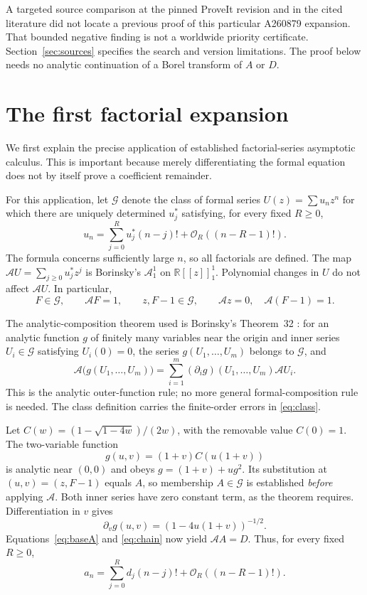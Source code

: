 \documentclass[11pt,letterpaper]{article}
\numberwithin{equation}{section}
\theoremstyle{remark}\newtheorem{remark}[theorem]{Remark}
\newcommand{\R}{\mathbb R}
\newcommand{\Ord}{\mathcal O}
\newcommand{\As}{\mathcal A}
\begin{document}
A targeted source comparison at the pinned ProveIt revision and in the cited literature did not locate a previous proof of this particular A260879 expansion. That bounded negative finding is not a worldwide priority certificate. Section~\ref{sec:sources} specifies the search and version limitations. The proof below needs no analytic continuation of a Borel transform of $A$ or $D$.

\section{The first factorial expansion}
\label{sec:factorial}
We first explain the precise application of established factorial-series asymptotic calculus. This is important because merely differentiating the formal equation does not by itself prove a coefficient remainder.

For this application, let $\mathcal G$ denote the class of formal series $U(z)=\sum u_nz^n$ for which there are uniquely determined $u_j^*$ satisfying, for every fixed $R\ge0$,
\begin{equation}\label{eq:class}
 u_n=\sum_{j=0}^{R}u_j^*(n-j)!+\Ord_R((n-R-1)!).
\end{equation}
The formula concerns sufficiently large $n$, so all factorials are defined. The map $\As U=\sum_{j\ge0}u_j^*z^j$ is Borinsky's $\As_1^1$ on $\R[[z]]_1^1$. Polynomial changes in $U$ do not affect $\As U$. In particular,
\begin{equation}\label{eq:baseA}
 F\in\mathcal G,\qquad \As F=1,\qquad
 z,F-1\in\mathcal G,\qquad \As z=0,\quad\As(F-1)=1.
\end{equation}

The analytic-composition theorem used is Borinsky's Theorem~32 \cite{borinsky}: for an analytic function $g$ of finitely many variables near the origin and inner series $U_i\in\mathcal G$ satisfying $U_i(0)=0$, the series $g(U_1,\ldots,U_m)$ belongs to $\mathcal G$, and
\begin{equation}\label{eq:chain}
 \As\bigl(g(U_1,\ldots,U_m)\bigr)
 =\sum_{i=1}^{m}(\partial_i g)(U_1,\ldots,U_m)\As U_i.
\end{equation}
This is the analytic outer-function rule; no more general formal-composition rule is needed. The class definition carries the finite-order errors in \eqref{eq:class}.

Let $C(w)=(1-\sqrt{1-4w})/(2w)$, with the removable value $C(0)=1$. The two-variable function
\[
 g(u,v)=(1+v)C(u(1+v))
\]
is analytic near $(0,0)$ and obeys $g=(1+v)+ug^2$. Its substitution at $(u,v)=(z,F-1)$ equals $A$, so membership $A\in\mathcal G$ is established \emph{before} applying $\As$. Both inner series have zero constant term, as the theorem requires. Differentiation in $v$ gives
\[
 \partial_vg(u,v)=(1-4u(1+v))^{-1/2}.
\]
Equations~\eqref{eq:baseA} and \eqref{eq:chain} now yield $\As A=D$. Thus, for every fixed $R\ge0$,
\begin{equation}\label{eq:a-factorial}
 a_n=\sum_{j=0}^{R}d_j(n-j)!+\Ord_R((n-R-1)!).
\end{equation}
\end{document}
